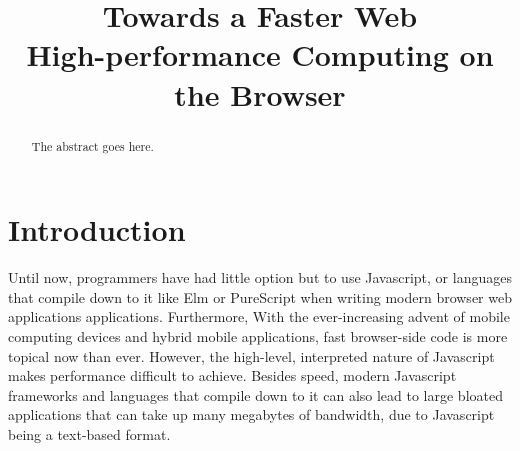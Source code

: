\documentclass[conference]{IEEEtran}
\begin{document}
\title{Towards a Faster Web\\High-performance Computing on the Browser}

\author{
\and
{}
\and
{}
}

\maketitle

\begin{abstract}
The abstract goes here.
\end{abstract}

\section{Introduction}
Until now, programmers have had little option but to use Javascript, or
languages that compile down to it like Elm or PureScript when writing modern
browser web applications applications. Furthermore, With the ever-increasing
advent of mobile computing devices and hybrid mobile applications, fast
browser-side code is more topical now than ever. However, the high-level,
interpreted nature of Javascript makes performance difficult to achieve.
Besides speed, modern Javascript frameworks and languages that compile down to
it can also lead to large bloated applications that can take up many megabytes
of bandwidth, due to Javascript being a text-based format.
\end{document}
